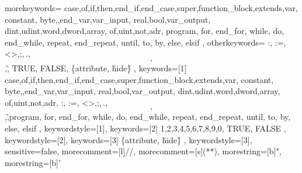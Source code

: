 
{
	morekeywords={
	case,of,if,then,end_if,end_case,super,function_block,extends,var,
	constant, byte,,end_var,var_input, real,bool,var_output,
	dint,udint,word,dword,array, of,uint,not,adr, program, for, end_for, while, do, end_while, repeat, end_repeat, until, to, by, else, elsif
	},
	otherkeywords={
		:, :=, <>,;,\,.,\[,\],\^, TRUE, FALSE, \{attribute,  \'hide\'\}
	},
	keywords=[1]{
		case,of,if,then,end_if,end_case,super,function_block,extends,var,
		constant, byte,,end_var,var_input, real,bool,var_output,
		dint,udint,word,dword,array, of,uint,not,adr, :, :=, <>,;,\,.,\[,\],\^,program, for, end_for, while, do, end_while, repeat, end_repeat, until, to, by, else, elsif
	},
	keywordstyle=[1]\color{blue},
	keywords=[2]{
		1,2,3,4,5,6,7,8,9,0, TRUE, FALSE
	},
	keywordstyle=[2]\color{codepurple},
	keywords=[3]{
		\{attribute,  \'hide\'\}
	},
	keywordstyle=[3]\color{codegray},
	sensitive=false,
	morecomment=[l]{//}, 
	morecomment=[s]{(*}{*)},
	morestring=[b]{"},
	morestring=[b]{'}
}


